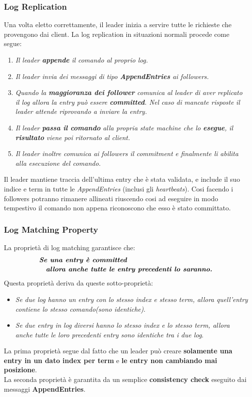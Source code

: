   \subsubsection{Log Replication}
  Una volta eletto correttamente, il leader inizia a servire tutte le richieste che provengono dai client. La log replication in situazioni normali procede come segue:
  \begin{enumerate}
    \item{\emph{Il leader \textbf{appende} il comando al proprio log.}}
    \item{\emph{Il leader invia dei messaggi di tipo \textbf{AppendEntries} ai followers.}}
    \item{\emph{Quando la \textbf{maggioranza dei follower} comunica al leader di aver replicato il log allora la entry può essere \textbf{committed}. Nel caso di mancate risposte il leader attende riprovando a inviare la entry.}}
    \item{\emph{Il leader \textbf{passa il comando} alla propria state machine che lo \textbf{esegue}, il \textbf{risultato} viene poi ritornato al client.}}
    \item{\emph{Il leader inoltre comunica ai followers il commitment e finalmente li abilita alla esecuzione del comando.}}
  \end{enumerate}
  Il leader mantiene traccia dell'ultima entry che è stata validata, e include il suo indice e term in tutte le \textit{AppendEntries} (inclusi gli \textit{heartbeats}). Cosi facendo i followers potranno rimanere allineati riuscendo cosi ad eseguire in modo tempestivo il comando non appena riconoscono che esso è stato committato.

  \subsubsection{Log Matching Property}
  \label{Log Matching}
  La proprietà di log matching garantisce che:
  \[
    \begin{multlined}
    \emph{\textbf{Se una entry è committed}}\\
    \emph{\textbf{allora anche tutte 
    le entry precedenti lo saranno.}}
    \end{multlined}
  \]
  Questa proprietà deriva da queste sotto-proprietà:
  \begin{itemize}
    \item{\emph{Se due log hanno un entry con lo stesso index e stesso term, allora quell'entry contiene lo stesso comando(sono identiche)}}.
    \item{\emph{Se due \textit{entry} in log diversi hanno lo stesso index e lo stesso term, allora anche tutte le loro precedenti entry sono identiche tra i due log}}.
  \end{itemize}
  La prima proprietà segue dal fatto che un leader può creare \textbf{solamente una entry in un dato index per term} e \textbf{le entry non cambiando mai posizione}.\\
  La seconda proprietà è garantita da un semplice \textbf{consistency check} eseguito dai messaggi \textbf{AppendEntries}.
